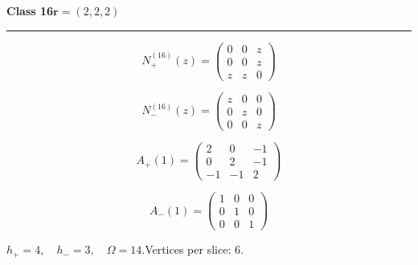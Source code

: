 \noindent\begin{minipage}{\linewidth}
\noindent\textbf{Class 16}\hfill $\symbf{r}=(2,2,2)$
\par\smallskip\noindent\textcolor{rulegray}{\rule{\linewidth}{0.3pt}}
\begin{minipage}[c]{0.495\linewidth}\centering\fontsize{10.5}{13}\selectfont
\setlength{\abovedisplayskip}{3pt}\setlength{\belowdisplayskip}{3pt}
\setlength{\abovedisplayshortskip}{3pt}\setlength{\belowdisplayshortskip}{3pt}
\setlength{\arraycolsep}{3.5pt}\renewcommand{\arraystretch}{1.18}
\[N_{+}^{(16)}(z)=\begin{pmatrix}0 & 0 & z\\0 & 0 & z\\z & z & 0\end{pmatrix}\]
\end{minipage}%
\begin{minipage}[c]{0.495\linewidth}\centering\fontsize{10.5}{13}\selectfont
\setlength{\abovedisplayskip}{3pt}\setlength{\belowdisplayskip}{3pt}
\setlength{\abovedisplayshortskip}{3pt}\setlength{\belowdisplayshortskip}{3pt}
\setlength{\arraycolsep}{3.5pt}\renewcommand{\arraystretch}{1.18}
\[N_{-}^{(16)}(z)=\begin{pmatrix}z & 0 & 0\\0 & z & 0\\0 & 0 & z\end{pmatrix}\]
\end{minipage}%
\par\noindent
\begin{minipage}[c]{0.495\linewidth}\centering\fontsize{10.5}{13}\selectfont
\setlength{\abovedisplayskip}{3pt}\setlength{\belowdisplayskip}{3pt}
\setlength{\abovedisplayshortskip}{3pt}\setlength{\belowdisplayshortskip}{3pt}
\setlength{\arraycolsep}{3.5pt}\renewcommand{\arraystretch}{1.18}
\[A_{+}(1)=\begin{pmatrix}2 & 0 & -1\\0 & 2 & -1\\-1 & -1 & 2\end{pmatrix}\]
\end{minipage}%
\begin{minipage}[c]{0.495\linewidth}\centering\fontsize{10.5}{13}\selectfont
\setlength{\abovedisplayskip}{3pt}\setlength{\belowdisplayskip}{3pt}
\setlength{\abovedisplayshortskip}{3pt}\setlength{\belowdisplayshortskip}{3pt}
\setlength{\arraycolsep}{3.5pt}\renewcommand{\arraystretch}{1.18}
\[A_{-}(1)=\begin{pmatrix}1 & 0 & 0\\0 & 1 & 0\\0 & 0 & 1\end{pmatrix}\]
\end{minipage}%
\par\smallskip\noindent\small $h_+=4,\quad h_-=3,\quad \Omega=14.$\quad Vertices per slice: 6.
\end{minipage}\par\vfill
